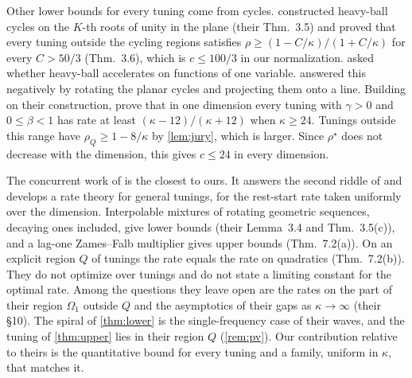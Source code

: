 \documentclass[11pt, a4paper]{article}
\theoremstyle{definition}
\begin{document}
Other lower bounds for every tuning come from cycles.  constructed heavy-ball cycles on the
$K$-th roots of unity in the plane (their Thm.~3.5) and proved that every tuning outside the cycling regions satisfies
$\rho\ge(1-C/\kappa)/(1+C/\kappa)$ for every $C>50/3$ (Thm.~3.6), which is $c\le100/3$ in our normalization.
 asked whether heavy-ball accelerates on functions of one variable.
 answered this negatively by rotating the planar cycles and projecting them onto a line.
Building on their construction, \citet[App.~F]{liu2026sharp} prove that in one dimension every tuning with $\gamma>0$
and $0\le\beta<1$ has rate at least $(\kappa-12)/(\kappa+12)$ when $\kappa\ge24$. Tunings outside this range have
$\rho_Q\ge1-8/\kappa$ by \cref{lem:jury}, which is larger. Since $\rho^\star$ does not decrease with the dimension, this gives $c\le24$ in every dimension.

The concurrent work of \citet{pasechniuk2026two} is the closest to ours. It answers the second riddle of
\citet{goujaud2025riddles} and develops a rate theory for general tunings, for the rest-start rate taken uniformly over the
dimension. Interpolable mixtures of rotating geometric sequences, decaying ones included, give lower bounds (their
Lemma~3.4 and Thm.~3.5(c)), and a lag-one Zames--Falb multiplier gives upper bounds (Thm.~7.2(a)). On an explicit region
$Q$ of tunings the rate equals the rate on quadratics (Thm.~7.2(b)). They do not optimize over tunings and do not state a limiting constant for the optimal rate. Among the
questions they leave open are the rates on the part of their region $\Omega_1$ outside $Q$ and the asymptotics of their
gaps as $\kappa\to\infty$ (their §10). The spiral of \cref{thm:lower} is the single-frequency case of their waves, and
the tuning of \cref{thm:upper} lies in their region $Q$ (\cref{rem:pv}). Our contribution relative to theirs is the
quantitative bound for every tuning and a family, uniform in $\kappa$, that matches it.
\end{document}
